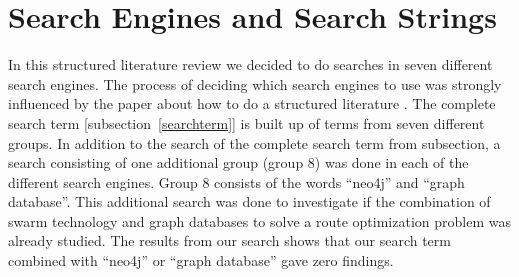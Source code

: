 \section{Search Engines and Search Strings}
\label{sec:searchEngines}
In this structured literature review we decided to do searches in seven different search engines. The process of deciding which search engines to use was strongly influenced by the paper about how to do a structured literature \citep{kofod2014}. The complete search term [subsection~\ref{searchterm}] is built up of terms from seven different groups. In addition to the search of the complete search term from subsection, a search consisting of one additional group (group 8) was done in each of the different search engines. Group 8 consists of the words ``neo4j'' and ``graph database''. This additional search was done to investigate if the combination of swarm technology and graph databases to solve a route optimization problem was already studied. The results from our search shows that our search term combined with ``neo4j'' or ``graph database'' gave zero findings. 


